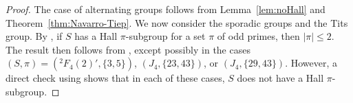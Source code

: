\documentclass[12pt]{amsart}
\theoremstyle{definition}
\numberwithin{equation}{section}
\begin{document}
\begin{proof}
The %
case of alternating groups follows from Lemma~\ref{lem:noHall}
and Theorem~\ref{thm:Navarro-Tiep}. We now consider the sporadic
groups and the Tits group. By \cite[Theorem~6.14]{G86}, if $S$ has a
Hall $\pi$-subgroup for a set $\pi$ of odd primes, %
then $|\pi| \le
2$. %
The result then follows from \cite[Theorem~2.1]{GHSV21}, except
possibly in the cases $(S,\pi)=({}^2F_4(2)',\{3,5\})$, $(J_4,
\{23,43\})$, or $(J_4,\{29,43\})$. However, a direct check using
\cite{Atl1} shows that %
in each of %
these cases, $S$ does not have a
Hall %
$\pi$-subgroup.
\end{proof}

\end{document}
